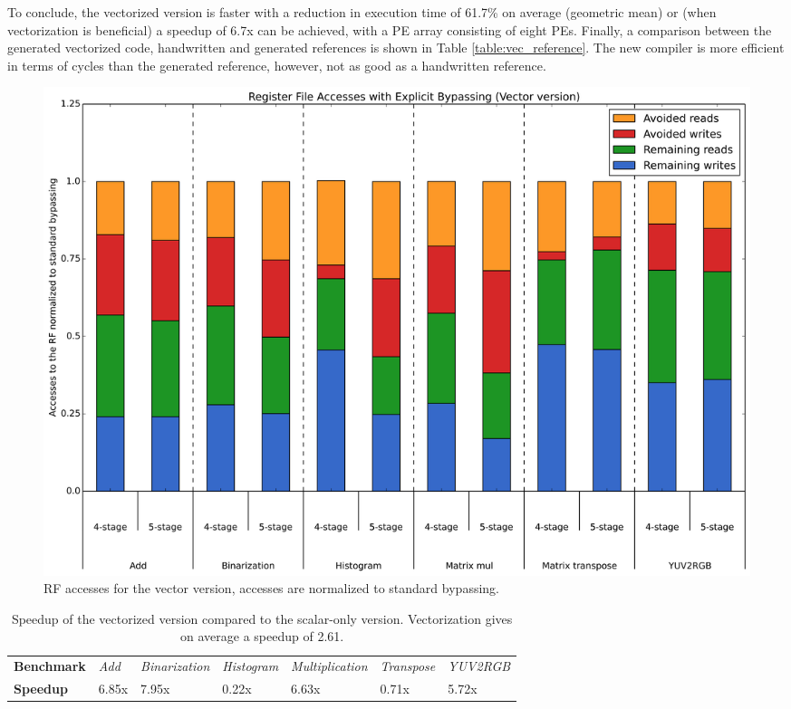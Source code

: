 To conclude, the vectorized version is faster with a reduction in execution time of 61.7\% on average (geometric mean) or (when vectorization is beneficial) a speedup of 6.7x can be achieved, with a PE array consisting of eight PEs. Finally, a comparison between the generated vectorized code, handwritten and generated references is shown in Table \ref{table:vec_reference}. The new compiler is more efficient in terms of cycles than the generated reference, however, not as good as a handwritten reference. 


\begin{figure}[t!]
\centering
\hspace*{-.12in}
\includegraphics[width=.875\textwidth]{figures/stats/vec_accesses}
\caption{RF accesses for the vector version, accesses are normalized to standard bypassing.}
\label{fig:vec_accesses}
\end{figure}

\begin{table}[t!]
\caption{Speedup of the vectorized version compared to the scalar-only version. Vectorization gives on average a speedup of 2.61.}
\begin{center}
\begin{tabular}{@{}l | l l l l l l @{}}
\toprule
\textbf{Benchmark} 	& \emph{Add} & \emph{Binarization} & \emph{Histogram} & \emph{Multiplication} & \emph{Transpose} & \emph{YUV2RGB}\\
\textbf{Speedup} 	& 6.85x & 7.95x & 0.22x & 6.63x & 0.71x & 5.72x\\
\bottomrule
\end{tabular}
\end{center}
\label{table:vector_speedup}
\end{table}%


